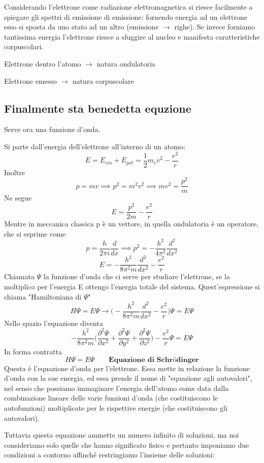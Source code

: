 Considerando l'elettrone come radiazione elettromagnetica si riesce facilmente a spiegare gli spettri di emissione di emissione: fornendo energia ad un elettrone esso si sposta da uno stato ad un altro (emissione $\rightarrow$ righe). Se invece forniamo tantissima energia l'elettrone riesce a sfuggire al nucleo e manifesta caratteristiche corpuscolari.

Elettrone dentro l'atomo $\rightarrow$ natura ondulatoria

Elettrone emesso $\rightarrow$ natura corpuscolare
\subsection{Finalmente sta benedetta equzione}
Serve ora una funzione d'onda.

Si parte dall'energia dell'elettrone all'interno di un atomo:
$$E=E_{cin} + E_{pot}=\frac{1}{2}m_ev^2 - \frac{e^2}{r}$$
Inoltre
$$p=mv \implies p^2=m^2v^2 \implies mv^2=\frac{p^2}{m}$$
Ne segue
$$E=\frac{p^2}{2m} - \frac{e^2}{r}$$
Mentre in meccanica classica p è un vettore, in quella ondulatoria è un operatore, che si esprime come
$$p=\frac{h}{2\pi i}\frac{d}{dx}\implies p^2=-\frac{h^2}{4\pi^2}\frac{d^2}{dx^2}$$
$$E=-\frac{h^2}{8\pi^2m}\frac{d^2}{dx^2} -\frac{e^2}{r}$$
Chiamata $\Psi$ la funzione d'onda che ci serve per studiare l'elettrone, se la moltiplico per l'energia E ottengo l'energia totale del sistema. Quest'espressione si chiama "Hamiltoniana di $\Psi$"
$$H\Psi=E\Psi \rightarrow \biggl(-\frac{h^2}{8\pi^2m}\frac{d^2}{dx^2} -\frac{e^2}{r}\biggr)\Psi=E\Psi$$
Nello spazio l'equazione diventa
$$-\frac{h^2}{8\pi^2m}\biggl( \frac{\partial^2\Psi}{\partial x^2}+\frac{\partial^2\Psi}{\partial y^2}+\frac{\partial^2\Psi}{\partial z^2}\biggr) -\frac{e^2}{r}\Psi =E\Psi$$
In forma contratta
$$H\Psi=E\Psi \qquad \textbf{Equazione di Schrödinger}$$
Questa è l'equazione d'onda per l'elettrone. Essa mette in relazione la funzione d'onda con la sue energia, ed essa prende il nome di "equazione agli autovalori", nel senso che possiamo immaginare l'energia dell'atomo come data dalla combinazione lineare delle varie funzioni d'onda (che costituiscono le autofunzioni) moltiplicate per le rispettive energie (che costituiscono gli autovalori).

Tuttavia questa equazione ammette un numero infinito di soluzioni, ma noi consideriamo solo quelle che hanno significato fisico e pertanto imponiamo due condizioni a contorno affinché restringiamo l'insieme delle soluzioni:

